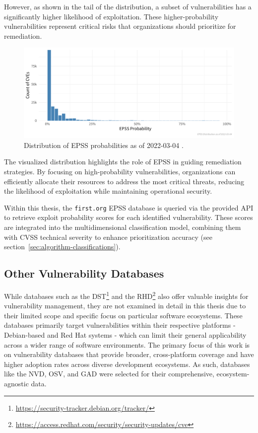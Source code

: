 However, as shown in the tail of the distribution, a subset of vulnerabilities has a significantly higher likelihood of exploitation. These higher-probability vulnerabilities represent critical risks that organizations should prioritize for remediation.

\begin{figure}[H]
    \centering
    \includegraphics[width=\textwidth]{resources/EPSS_Prob_Dist.png}
    \caption{Distribution of \ac{EPSS} probabilities as of 2022-03-04 \autocite{first_exploit_2022}.}
    \label{fig:epss-distribution}
\end{figure}

The visualized distribution highlights the role of \ac{EPSS} in guiding remediation strategies. By focusing on high-probability vulnerabilities, organizations can efficiently allocate their resources to address the most critical threats, reducing the likelihood of exploitation while maintaining operational security.

Within this thesis, the \texttt{first.org} \ac{EPSS} database is queried via the provided \ac{API} to retrieve exploit probability scores for each identified vulnerability. These scores are integrated into the multidimensional classification model, combining them with \ac{CVSS} technical severity to enhance prioritization accuracy (see section~\ref{sec:algorithm-classifications}).

\subsection{Other Vulnerability Databases}
\label{subsec:other-vulnerability-databases}

While databases such as the \ac{DST}\footnote{\url{https://security-tracker.debian.org/tracker/}} and the \ac{RHD}\footnote{\url{https://access.redhat.com/security/security-updates/cve}} also offer valuable insights for vulnerability management, they are not examined in detail in this thesis due to their limited scope and specific focus on particular software ecosystems. These databases primarily target vulnerabilities within their respective platforms  -  Debian-based and Red Hat systems  -  which can limit their general applicability across a wider range of software environments. The primary focus of this work is on vulnerability databases that provide broader, cross-platform coverage and have higher adoption rates across diverse development ecosystems. As such, databases like the \ac{NVD}, \ac{OSV}, and \ac{GAD} were selected for their comprehensive, ecosystem-agnostic data.

